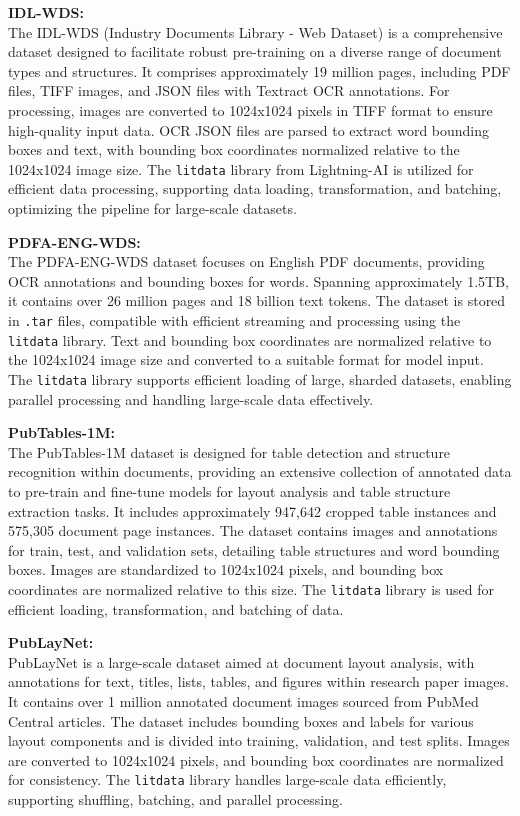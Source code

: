 \documentclass{article}
\begin{document}
\textbf{IDL-WDS:} \\
The IDL-WDS (Industry Documents Library - Web Dataset) is a comprehensive dataset designed to facilitate robust pre-training on a diverse range of document types and structures. It comprises approximately 19 million pages, including PDF files, TIFF images, and JSON files with Textract OCR annotations. For processing, images are converted to 1024x1024 pixels in TIFF format to ensure high-quality input data. OCR JSON files are parsed to extract word bounding boxes and text, with bounding box coordinates normalized relative to the 1024x1024 image size. The \texttt{litdata} library from Lightning-AI is utilized for efficient data processing, supporting data loading, transformation, and batching, optimizing the pipeline for large-scale datasets.

\textbf{PDFA-ENG-WDS:} \\
The PDFA-ENG-WDS dataset focuses on English PDF documents, providing OCR annotations and bounding boxes for words. Spanning approximately 1.5TB, it contains over 26 million pages and 18 billion text tokens. The dataset is stored in \texttt{.tar} files, compatible with efficient streaming and processing using the \texttt{litdata} library. Text and bounding box coordinates are normalized relative to the 1024x1024 image size and converted to a suitable format for model input. The \texttt{litdata} library supports efficient loading of large, sharded datasets, enabling parallel processing and handling large-scale data effectively.

\textbf{PubTables-1M:} \\
The PubTables-1M dataset is designed for table detection and structure recognition within documents, providing an extensive collection of annotated data to pre-train and fine-tune models for layout analysis and table structure extraction tasks. It includes approximately 947,642 cropped table instances and 575,305 document page instances. The dataset contains images and annotations for train, test, and validation sets, detailing table structures and word bounding boxes. Images are standardized to 1024x1024 pixels, and bounding box coordinates are normalized relative to this size. The \texttt{litdata} library is used for efficient loading, transformation, and batching of data.

\textbf{PubLayNet:} \\
PubLayNet is a large-scale dataset aimed at document layout analysis, with annotations for text, titles, lists, tables, and figures within research paper images. It contains over 1 million annotated document images sourced from PubMed Central articles. The dataset includes bounding boxes and labels for various layout components and is divided into training, validation, and test splits. Images are converted to 1024x1024 pixels, and bounding box coordinates are normalized for consistency. The \texttt{litdata} library handles large-scale data efficiently, supporting shuffling, batching, and parallel processing.
\end{document}
